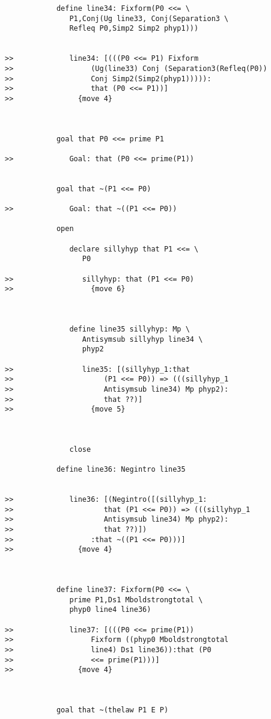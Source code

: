 \documentclass[12pt]{article}
\begin{document}
\begin{verbatim}
            define line34: Fixform(P0 <<= \
               P1,Conj(Ug line33, Conj(Separation3 \
               Refleq P0,Simp2 Simp2 phyp1)))


>>             line34: [(((P0 <<= P1) Fixform
>>                  (Ug(line33) Conj (Separation3(Refleq(P0))
>>                  Conj Simp2(Simp2(phyp1))))):
>>                  that (P0 <<= P1))]
>>               {move 4}



            goal that P0 <<= prime P1

>>             Goal: that (P0 <<= prime(P1))


            goal that ~(P1 <<= P0)

>>             Goal: that ~((P1 <<= P0))

            open

               declare sillyhyp that P1 <<= \
                  P0

>>                sillyhyp: that (P1 <<= P0)
>>                  {move 6}



               define line35 sillyhyp: Mp \
                  Antisymsub sillyhyp line34 \
                  phyp2

>>                line35: [(sillyhyp_1:that
>>                     (P1 <<= P0)) => (((sillyhyp_1
>>                     Antisymsub line34) Mp phyp2):
>>                     that ??)]
>>                  {move 5}



               close

            define line36: Negintro line35


>>             line36: [(Negintro([(sillyhyp_1:
>>                     that (P1 <<= P0)) => (((sillyhyp_1
>>                     Antisymsub line34) Mp phyp2):
>>                     that ??)])
>>                  :that ~((P1 <<= P0)))]
>>               {move 4}



            define line37: Fixform(P0 <<= \
               prime P1,Ds1 Mboldstrongtotal \
               phyp0 line4 line36)

>>             line37: [(((P0 <<= prime(P1))
>>                  Fixform ((phyp0 Mboldstrongtotal
>>                  line4) Ds1 line36)):that (P0
>>                  <<= prime(P1)))]
>>               {move 4}



            goal that ~(thelaw P1 E P)


\end{verbatim}
\end{document}
